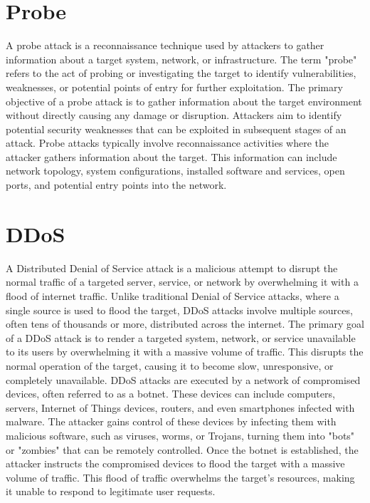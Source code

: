 \section{Probe}
\vspace{-18pt}
A probe attack is a reconnaissance technique used by attackers to gather information about a target system, network, or infrastructure. The term "probe" refers to the act of probing or investigating the target to identify vulnerabilities, weaknesses, or potential points of entry for further exploitation. The primary objective of a probe attack is to gather information about the target environment without directly causing any damage or disruption. Attackers aim to identify potential security weaknesses that can be exploited in subsequent stages of an attack. Probe attacks typically involve reconnaissance activities where the attacker gathers information about the target. This information can include network topology, system configurations, installed software and services, open ports, and potential entry points into the network.
\section{DDoS}
\vspace{-18pt}
A Distributed Denial of Service attack is a malicious attempt to disrupt the normal traffic of a targeted server, service, or network by overwhelming it with a flood of internet traffic. Unlike traditional Denial of Service attacks, where a single source is used to flood the target, DDoS attacks involve multiple sources, often tens of thousands or more, distributed across the internet. The primary goal of a DDoS attack is to render a targeted system, network, or service unavailable to its users by overwhelming it with a massive volume of traffic. This disrupts the normal operation of the target, causing it to become slow, unresponsive, or completely unavailable. DDoS attacks are executed by a network of compromised devices, often referred to as a botnet. These devices can include computers, servers, Internet of Things devices, routers, and even smartphones infected with malware. The attacker gains control of these devices by infecting them with malicious software, such as viruses, worms, or Trojans, turning them into "bots" or "zombies" that can be remotely controlled. Once the botnet is established, the attacker instructs the compromised devices to flood the target with a massive volume of traffic. This flood of traffic overwhelms the target's resources, making it unable to respond to legitimate user requests.
